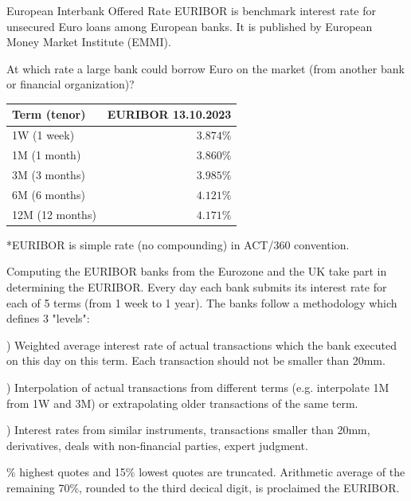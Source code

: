 \documentclass{beamer}
\begin{document}
\begin{frame}{European Interbank Offered Rate}
\justify
\alert{EURIBOR} is benchmark interest rate for unsecured Euro loans among European banks. It is published by European Money Market Institute (EMMI).

\justify
At which rate a large bank could borrow Euro on the market (from another bank or financial organization)?

\justify
\centering
\begin{tabular}{l|r}
Term (tenor)     & EURIBOR 13.10.2023 \\ \hline
1W (1 week)    & $3.874\%$ \\
1M (1 month)     & $3.860\%$ \\
3M (3 months)    & $3.985\%$ \\
6M (6 months)   & $4.121\%$ \\
12M (12 months) & $4.171\%$ 
\end{tabular}

\justify
*EURIBOR is simple rate (no compounding) in ACT/360 convention.
\end{frame}



\begin{frame}{Computing the EURIBOR}
 banks from the Eurozone and the UK take part in determining the EURIBOR. Every day each bank submits its interest rate for each of 5 terms (from 1 week to 1 year). The banks follow a methodology which defines 3 "levels":

) Weighted average interest rate of actual transactions which the bank executed on this day on this term. Each transaction should not be smaller than 20mm.

) Interpolation of actual transactions from different terms (e.g. interpolate 1M from 1W and 3M) or extrapolating older transactions of the same term.

) Interest rates from similar instruments, transactions smaller than 20mm, derivatives, deals with non-financial parties, expert judgment. 

\% highest quotes and 15\% lowest quotes are truncated. Arithmetic average of the remaining 70\%, rounded to the third decical digit, is proclaimed the EURIBOR.
\end{frame}
\end{document}
